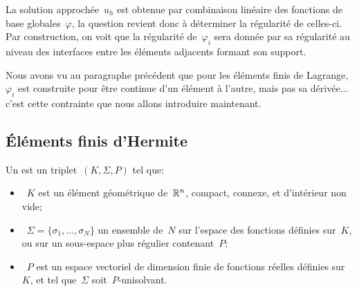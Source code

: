 La solution approchée~$u_h$ est obtenue par combinaison linéaire des fonctions de base globales~$\varphi$, la question revient donc à déterminer la régularité de celles-ci. Par construction, on voit que la régularité de~$\varphi_i$ sera donnée par sa régularité au niveau des interfaces entre les éléments adjacents formant son support.

Nous avons vu au paragraphe précédent que pour les éléments finis de Lagrange, $\varphi_i$ est construite pour être continue d'un élément à l'autre, mais pas sa dérivée... c'est cette contrainte que nous allons introduire maintenant.


\ifVersionDuDocEstVincent\medskip\else\newpage\fi
\subsection{Éléments finis d'Hermite}

\begin{definition}
Un  est un triplet~$(K, \Sigma, P)$ tel que:
\begin{itemize}
\item~$K$ est un élément géométrique de~$\mathbb R^n$, compact, connexe, et d'intérieur non vide;
\item~$\Sigma=\{\sigma_1,\ldots, \sigma_N\}$ un ensemble de~$N$  sur l'espace des fonctions définies sur~$K$, ou sur un sous-espace plus régulier contenant~$P$;
\item~$P$ est un espace vectoriel de dimension finie de fonctions réelles définies sur~$K$, et tel que~$\Sigma$ soit~$P$-unisolvant.
\end{itemize}
\end{definition}

